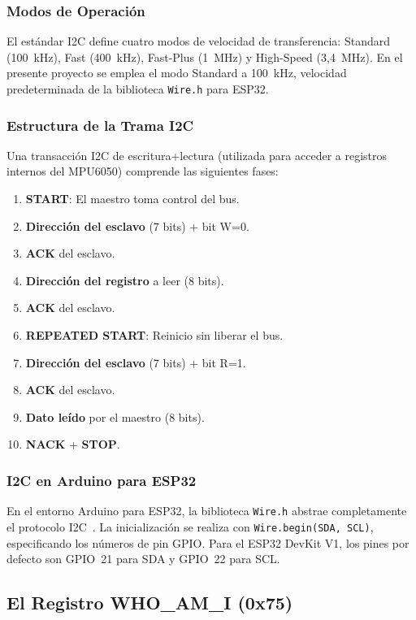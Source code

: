 \documentclass[10pt,twocolumn,a4paper]{article}
\begin{document}
\subsubsection{Modos de Operación}

El estándar I2C define cuatro modos de velocidad de transferencia:
Standard (100~kHz), Fast (400~kHz), Fast-Plus (1~MHz) y High-Speed
(3,4~MHz). En el presente proyecto se emplea el modo Standard a 100~kHz,
velocidad predeterminada de la biblioteca \texttt{Wire.h} para ESP32.

\subsubsection{Estructura de la Trama I2C}

Una transacción I2C de escritura+lectura (utilizada para acceder a
registros internos del MPU6050) comprende las siguientes fases:
\begin{enumerate}
  \item \textbf{START}: El maestro toma control del bus.
  \item \textbf{Dirección del esclavo} (7 bits) + bit W=0.
  \item \textbf{ACK} del esclavo.
  \item \textbf{Dirección del registro} a leer (8 bits).
  \item \textbf{ACK} del esclavo.
  \item \textbf{REPEATED START}: Reinicio sin liberar el bus.
  \item \textbf{Dirección del esclavo} (7 bits) + bit R=1.
  \item \textbf{ACK} del esclavo.
  \item \textbf{Dato leído} por el maestro (8 bits).
  \item \textbf{NACK} + \textbf{STOP}.
\end{enumerate}

\subsubsection{I2C en Arduino para ESP32}

En el entorno Arduino para ESP32, la biblioteca \texttt{Wire.h} abstrae
completamente el protocolo I2C~\cite{wire_arduino}. La inicialización
se realiza con \texttt{Wire.begin(SDA, SCL)}, especificando los números
de pin GPIO. Para el ESP32 DevKit V1, los pines por defecto son GPIO~21
para SDA y GPIO~22 para SCL.

\subsection{El Registro WHO\_AM\_I (0x75)}
\end{document}
